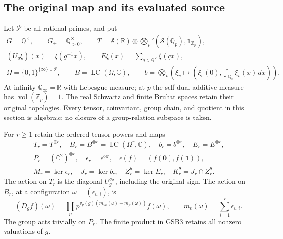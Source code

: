 \subsection{The original map and its evaluated source}

Let $\mathcal P$ be all rational primes, and put
\begin{equation}\tag{GSB1}
\begin{gathered}
G=\mathbb Q^\times,\qquad G_+=\mathbb Q_{>0}^\times,\qquad
T=\mathcal S(\mathbb R)\otimes\bigotimes_p'
 (\mathcal S(\mathbb Q_p),\mathbf1_{\mathbb Z_p}),\\
(U_g\xi)(x)=\xi(g^{-1}x),\qquad
E\xi(x)=\sum_{q\in\mathbb Q^\times}\xi(qx),\\
\Omega=\{0,1\}^{\{\infty\}\sqcup\mathcal P},\qquad
B=\operatorname{LC}(\Omega,\mathbb C),\qquad
b=\bigotimes_v\left(\xi_v\longmapsto
             (\xi_v(0),\int_{\mathbb Q_v}\xi_v(x)\,dx)\right).
\end{gathered}
\end{equation}
At infinity $\mathbb Q_\infty=\mathbb R$ with Lebesgue measure;
at $p$ the self-dual additive measure has
$\operatorname{vol}(\mathbb Z_p)=1$. The real Schwartz and finite
Bruhat spaces retain their original topologies. Every tensor,
coinvariant, group chain, and quotient in this section is algebraic;
no closure of a group-relation subspace is taken.

For $r\ge1$ retain the ordered tensor powers and maps
\begin{equation}\tag{GSB2}
\begin{gathered}
T_r=T^{\otimes r},\quad B_r=B^{\otimes r}
       =\operatorname{LC}(\Omega^r,\mathbb C),\quad
b_r=b^{\otimes r},\quad E_r=E^{\otimes r},\\
P_r=(\mathbb C^2)^{\otimes r},\quad
\epsilon_r=\epsilon^{\otimes r},\quad
\epsilon(f)=(f(\mathbf0),f(\mathbf1)),\\
M_r=\ker\epsilon_r,\quad J_r=\ker b_r,\quad
Z_r^\theta=\ker E_r,\quad K_r^\theta=J_r\cap Z_r^\theta.
\end{gathered}
\end{equation}
The action on $T_r$ is the diagonal $U_g^{\otimes r}$, including
the original sign. The action on $B_r$, at a configuration
$\omega=(\epsilon_{v,i})$, is
\begin{equation}\tag{GSB3}
(D_g f)(\omega)=\prod_p p^{v_p(g)(m_\infty(\omega)-m_p(\omega))}
 f(\omega),\qquad m_v(\omega)=\sum_{i=1}^r\epsilon_{v,i}.
\end{equation}
The group acts trivially on $P_r$. The finite product in GSB3
retains all nonzero valuations of $g$.

